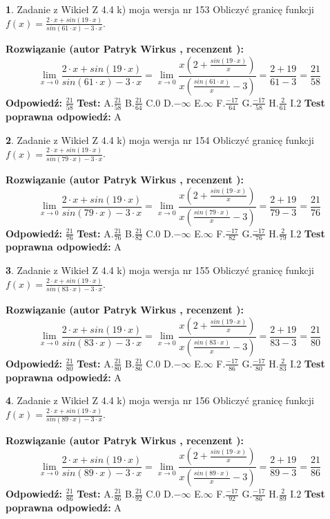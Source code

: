\documentclass[12pt, a4paper]{article}
\theoremstyle{definition} %
\newtheorem{zad}{}
\newcommand{\zadStart}[1]{\begin{zad}#1\newline}
\newcommand{\zadStop}{\end{zad}}
\newcommand{\rozwStart}[2]{\noindent \textbf{Rozwiązanie (autor #1 , recenzent #2): }\newline}
\newcommand{\rozwStop}{\newline}
\newcommand{\odpStart}{\noindent \textbf{Odpowiedź:}\newline}
\newcommand{\odpStop}{\newline}
\newcommand{\testStart}{\noindent \textbf{Test:}\newline}
\newcommand{\testStop}{\newline}
\newcommand{\kluczStart}{\noindent \textbf{Test poprawna odpowiedź:}\newline}
\newcommand{\kluczStop}{\newline}
\begin{document}
\zadStart{Zadanie z Wikieł Z 4.4 k) moja wersja nr 153}
Obliczyć granicę funkcji $f(x)=\frac{2\cdot x +sin(19\cdot x)}{sin(61\cdot x) -3\cdot x}$.
\zadStop
\rozwStart{Patryk Wirkus}{}
$$\lim\limits_{x\to 0}\frac{2\cdot x +sin(19\cdot x)}{sin(61\cdot x) -3\cdot x}
=\lim\limits_{x\to 0}\frac{x(2+\frac{sin(19\cdot x)}{x})}{x(\frac{sin(61\cdot x)}{x}-3)}
=\frac{2+19}{61-3} = \frac{21}{58}$$
\rozwStop
\odpStart
$\frac{21}{58}$
\odpStop
\testStart
A.$\frac{21}{58}$
B.$\frac{21}{64}$
C.$0$
D.$-\infty$
E.$\infty$
F.$\frac{-17}{64}$
G.$\frac{-17}{58}$
H.$\frac{2}{61}$
I.$2$
\testStop
\kluczStart
A
\kluczStop



\zadStart{Zadanie z Wikieł Z 4.4 k) moja wersja nr 154}
Obliczyć granicę funkcji $f(x)=\frac{2\cdot x +sin(19\cdot x)}{sin(79\cdot x) -3\cdot x}$.
\zadStop
\rozwStart{Patryk Wirkus}{}
$$\lim\limits_{x\to 0}\frac{2\cdot x +sin(19\cdot x)}{sin(79\cdot x) -3\cdot x}
=\lim\limits_{x\to 0}\frac{x(2+\frac{sin(19\cdot x)}{x})}{x(\frac{sin(79\cdot x)}{x}-3)}
=\frac{2+19}{79-3} = \frac{21}{76}$$
\rozwStop
\odpStart
$\frac{21}{76}$
\odpStop
\testStart
A.$\frac{21}{76}$
B.$\frac{21}{82}$
C.$0$
D.$-\infty$
E.$\infty$
F.$\frac{-17}{82}$
G.$\frac{-17}{76}$
H.$\frac{2}{79}$
I.$2$
\testStop
\kluczStart
A
\kluczStop



\zadStart{Zadanie z Wikieł Z 4.4 k) moja wersja nr 155}
Obliczyć granicę funkcji $f(x)=\frac{2\cdot x +sin(19\cdot x)}{sin(83\cdot x) -3\cdot x}$.
\zadStop
\rozwStart{Patryk Wirkus}{}
$$\lim\limits_{x\to 0}\frac{2\cdot x +sin(19\cdot x)}{sin(83\cdot x) -3\cdot x}
=\lim\limits_{x\to 0}\frac{x(2+\frac{sin(19\cdot x)}{x})}{x(\frac{sin(83\cdot x)}{x}-3)}
=\frac{2+19}{83-3} = \frac{21}{80}$$
\rozwStop
\odpStart
$\frac{21}{80}$
\odpStop
\testStart
A.$\frac{21}{80}$
B.$\frac{21}{86}$
C.$0$
D.$-\infty$
E.$\infty$
F.$\frac{-17}{86}$
G.$\frac{-17}{80}$
H.$\frac{2}{83}$
I.$2$
\testStop
\kluczStart
A
\kluczStop



\zadStart{Zadanie z Wikieł Z 4.4 k) moja wersja nr 156}
Obliczyć granicę funkcji $f(x)=\frac{2\cdot x +sin(19\cdot x)}{sin(89\cdot x) -3\cdot x}$.
\zadStop
\rozwStart{Patryk Wirkus}{}
$$\lim\limits_{x\to 0}\frac{2\cdot x +sin(19\cdot x)}{sin(89\cdot x) -3\cdot x}
=\lim\limits_{x\to 0}\frac{x(2+\frac{sin(19\cdot x)}{x})}{x(\frac{sin(89\cdot x)}{x}-3)}
=\frac{2+19}{89-3} = \frac{21}{86}$$
\rozwStop
\odpStart
$\frac{21}{86}$
\odpStop
\testStart
A.$\frac{21}{86}$
B.$\frac{21}{92}$
C.$0$
D.$-\infty$
E.$\infty$
F.$\frac{-17}{92}$
G.$\frac{-17}{86}$
H.$\frac{2}{89}$
I.$2$
\testStop
\kluczStart
A
\kluczStop
\end{document}
